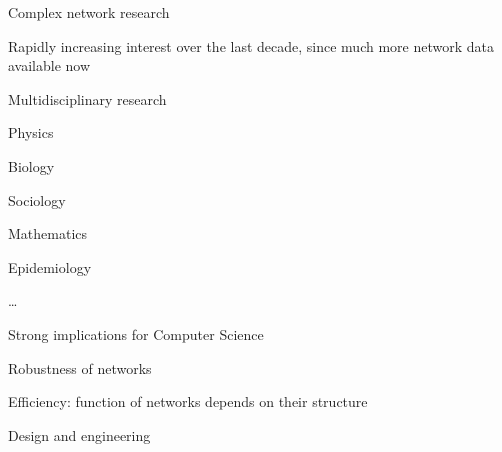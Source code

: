 \begin{frame}{Complex network research}

\BIL
\item Rapidly increasing interest over the last decade, since much more network data available now
\item Multidisciplinary research 
  \BI
  \item Physics
  \item Biology
  \item Sociology
  \item Mathematics
  \item Epidemiology
  \item \ldots
  \EI
\item Strong implications for Computer Science
\BI
\item Robustness of networks
\item Efficiency: function of networks depends on their structure
\item Design and engineering
\EI
\EIL
\end{frame}

